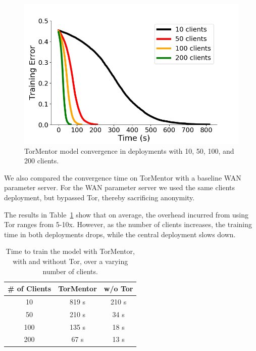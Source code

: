 \begin{figure}[t]
	\includegraphics[width=\linewidth]{fig/withtor}
	\caption{TorMentor model convergence in deployments with 10, 50,
          100, and 200 clients.
        }
	\label{fig:withtor}
\end{figure}


We also compared the convergence time on TorMentor with a baseline
WAN parameter server. For the WAN parameter server we used the same
clients deployment, but bypassed Tor, thereby sacrificing anonymity.

The results in Table~\ref{tab:latency} show that on average, the
overhead incurred from using Tor ranges from 5-10x. However, as the
number of clients increases, the training time in both deployments
drops, while the central deployment slows down.

\begin{table}[t]
\centering
\begin{tabular}{ c|cc }
 \hline
 \textbf{\# of Clients} & 
 \textbf{TorMentor}    & 
 \textbf{w/o Tor}  \\
 \hline
 10                    & 819 s & 210 s \\
 \hline
 50                    & 210 s  & 34 s \\
 \hline
 100                   & 135 s  & 18 s \\
 \hline
 200                   & 67 s   & 13 s \\
\end{tabular} 
\caption{Time to train the model with TorMentor, with and without Tor,
over a varying number of clients.
  \label{tab:latency}}
\end{table}


